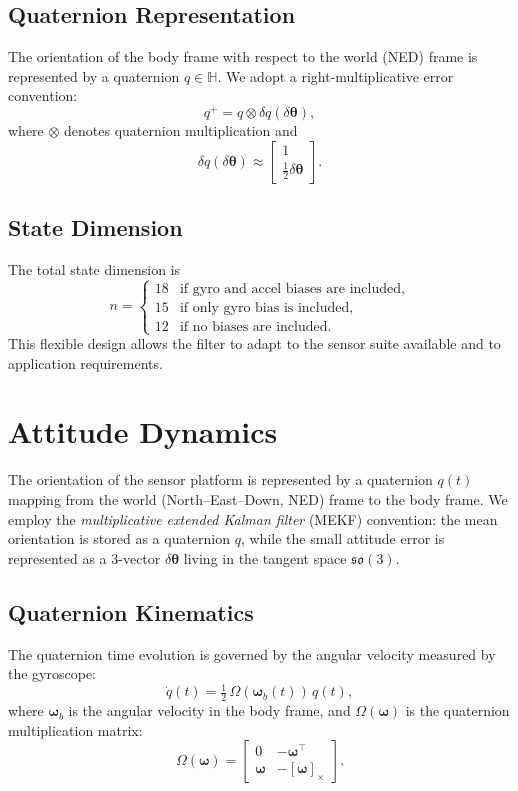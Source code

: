 \documentclass[11pt]{article}
\begin{document}
\subsection{Quaternion Representation}
The orientation of the body frame with respect to the world (NED) frame is represented by a quaternion $q \in \mathbb{H}$. 
We adopt a right-multiplicative error convention:
\begin{equation}
q^+ = q \otimes \delta q(\delta\bm\theta),
\end{equation}
where $\otimes$ denotes quaternion multiplication and
\begin{equation}
\delta q(\delta\bm\theta) \approx
\begin{bmatrix}
1 \\ \tfrac{1}{2}\delta\bm\theta
\end{bmatrix}.
\label{eq:small_angle_quaternion}
\end{equation}

\subsection{State Dimension}
The total state dimension is
\[
n =
\begin{cases}
18 & \text{if gyro and accel biases are included}, \\
15 & \text{if only gyro bias is included}, \\
12 & \text{if no biases are included}.
\end{cases}
\]
This flexible design allows the filter to adapt to the sensor suite available and to application requirements.

\section{Attitude Dynamics}

The orientation of the sensor platform is represented by a quaternion $q(t)$ mapping from the world 
(North--East--Down, NED) frame to the body frame. 
We employ the \emph{multiplicative extended Kalman filter} (MEKF) convention: 
the mean orientation is stored as a quaternion $q$, while the small attitude error 
is represented as a 3-vector $\delta\bm\theta$ living in the tangent space $\mathfrak{so}(3)$.

\subsection{Quaternion Kinematics}
The quaternion time evolution is governed by the angular velocity measured by the gyroscope:
\begin{equation}
\dot q(t) = \tfrac{1}{2} \, \Omega(\bm\omega_b(t)) \, q(t),
\label{eq:quat_kinematics}
\end{equation}
where $\bm\omega_b$ is the angular velocity in the body frame, 
and $\Omega(\bm\omega)$ is the quaternion multiplication matrix:
\begin{equation}
\Omega(\bm\omega) =
\begin{bmatrix}
0 & -\bm\omega^\top \\
\bm\omega & -[\bm\omega]_\times
\end{bmatrix}.
\end{equation}
\end{document}
